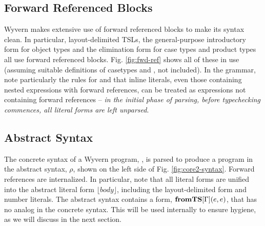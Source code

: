 \subsection{Forward Referenced Blocks}
Wyvern makes extensive use of forward referenced blocks to make its syntax clean. In particular, layout-delimited TSLs, the general-purpose introductory form for object types and the elimination form for case types and product types all use forward referenced blocks. Fig. \ref{fig:fwd-ref} shows all of these in use (assuming suitable definitions of casetypes  and , not included). In the grammar, note particularly the rules for  and that inline literals, even those containing nested expressions with forward references, can be treated as expressions not containing forward references -- \emph{in the initial phase of parsing, before typechecking commences, all literal forms are left unparsed}.

\subsection{Abstract Syntax}
The concrete syntax of a Wyvern program, , is parsed to produce a program in the abstract syntax, $\rho$, shown on the left side of Fig. \ref{fig:core2-syntax}. Forward references are internalized. In particular, note that all literal forms are unified into the abstract literal form $\lfloor body \rfloor$, including the layout-delimited form and number literals. The abstract syntax contains a form, $\textbf{fromTS}[\Gamma](e,e)$, that has no analog in the concrete syntax. This will be used internally to ensure hygiene, as we will discuss in the next section.

